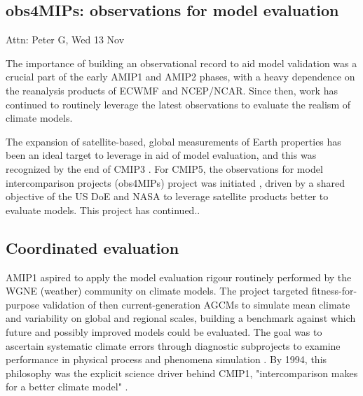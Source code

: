 \documentclass[gmd, preprint]{copernicus}
\def\cred#1{{\color{red}#1}}
\begin{document}
\subsection{obs4MIPs: observations for model evaluation}
\label{sec:CMIP6SupportingProjects-obs4MIPs}
\cred{Attn: Peter G, Wed 13 Nov}

The importance of building an observational record to aid model validation was a crucial part of the early AMIP1 \citep{gates_amip_1992} and AMIP2 \citep{gleckler_amip_1996-1} phases, with a heavy dependence on the reanalysis products of ECWMF and NCEP/NCAR. Since then, work has continued to routinely leverage the latest observations to evaluate the realism of climate models.

The expansion of satellite-based, global measurements of Earth properties has been an ideal target to leverage in aid of model evaluation, and this was recognized by the end of CMIP3 \citep{gleckler_improving_2011,teixeira_satellite_2011}. For CMIP5, the observations for model intercomparison projects (obs4MIPs) project was initiated \citep{teixeira_satellite_2014}, driven by a shared objective of the US DoE and NASA to leverage satellite products better to evaluate models. \cred{This project has continued.. \citep{waliser_observations_2020}}


\subsection{Coordinated evaluation}
\label{sec:CMIP6SupportingProjects-CoordEval}

AMIP1 aspired to apply the model evaluation rigour routinely performed by the WGNE (weather) community on climate models. The project targeted fitness-for-purpose validation of then current-generation AGCMs to simulate mean climate and variability on global and regional scales, building a benchmark against which future and possibly improved models could be evaluated. The goal was to ascertain systematic climate errors through diagnostic subprojects to examine performance in physical process and phenomena simulation \citep{gates_ams_1992}. By 1994, this philosophy was the explicit science driver behind CMIP1, "intercomparison makes for a better climate model" \citep{meehl_intercomparison_1997}.
\end{document}
